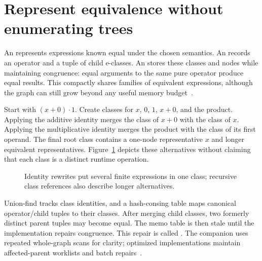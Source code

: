 \section{Represent equivalence without enumerating trees}
\label{sec:ch62-structure}

An  represents expressions known equal under the chosen semantics.
An  records an operator and a tuple of child e-classes.
An  stores these classes and nodes while maintaining congruence: equal arguments to the same pure operator produce equal results.
This compactly shares families of equivalent expressions, although the graph can still grow beyond any useful memory budget~\cite{willsey-2021-egg}.

Start with $(x+0)\cdot1$.
Create classes for $x$, $0$, $1$, $x+0$, and the product.
Applying the additive identity merges the class of $x+0$ with the class of $x$.
Applying the multiplicative identity merges the product with the class of its first operand.
The final root class contains a one-node representative $x$ and longer equivalent representatives.
Figure~\ref{fig:ch62-class} depicts these alternatives without claiming that each class is a distinct runtime operation.

\begin{figure}[htbp]
\centering
{}
\caption{Identity rewrites put several finite expressions in one class; recursive class references also describe longer alternatives.}
\label{fig:ch62-class}
\end{figure}

Union-find tracks class identities, and a hash-consing table maps canonical operator/child tuples to their classes.
After merging child classes, two formerly distinct parent tuples may become equal.
The memo table is then stale until the implementation repairs congruence.
This repair is called .
The companion uses repeated whole-graph scans for clarity; optimized implementations maintain affected-parent worklists and batch repairs~\cite{willsey-2021-egg}.


